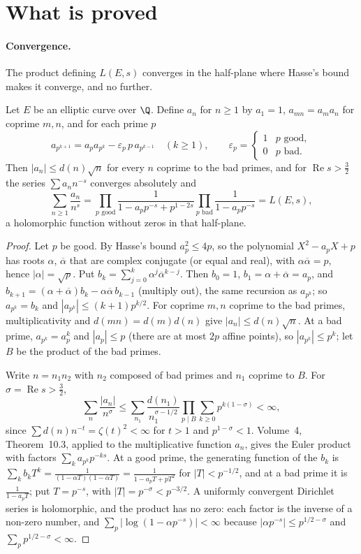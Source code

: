 \section{What is proved}

\paragraph{Convergence.} The product defining $L(E,s)$ converges in the half-plane where Hasse's bound makes it converge, and no further.

\begin{proposition}\label{conjectures:prop:eulerconv}
Let $E$ be an elliptic curve over $\Q$. Define $a_n$ for $n\ge1$ by $a_1=1$, $a_{mn}=a_ma_n$ for coprime $m,n$, and for each prime $p$
\[
a_{p^{k+1}}=a_pa_{p^k}-\varepsilon_p\,p\,a_{p^{k-1}}\quad(k\ge1),\qquad\varepsilon_p=\begin{cases}1&p\text{ good},\\0&p\text{ bad}.\end{cases}
\]
Then $|a_n|\le d(n)\sqrt n$ for every $n$ coprime to the bad primes, and for $\operatorname{Re}s>\frac32$ the series $\sum a_nn^{-s}$ converges absolutely and
\[
\sum_{n\ge1}\frac{a_n}{n^s}=\prod_{p\text{ good}}\frac1{1-a_pp^{-s}+p^{1-2s}}\prod_{p\text{ bad}}\frac1{1-a_pp^{-s}}=L(E,s),
\]
a holomorphic function without zeros in that half-plane.
\end{proposition}
\begin{proof}
Let $p$ be good. By Hasse's bound $a_p^2\le4p$, so the polynomial $X^2-a_pX+p$ has roots $\alpha$, $\overline\alpha$ that are complex conjugate (or equal and
real), with $\alpha\overline\alpha=p$, hence $|\alpha|=\sqrt p$. Put $b_k=\sum_{j=0}^k\alpha^j\overline\alpha^{k-j}$. Then $b_0=1$, $b_1=\alpha+\overline\alpha=a_p$,
and $b_{k+1}=(\alpha+\overline\alpha)b_k-\alpha\overline\alpha\,b_{k-1}$ (multiply out), the same recursion as $a_{p^k}$; so $a_{p^k}=b_k$ and $|a_{p^k}|\le(k+1)p^{k/2}$.
For coprime $m,n$ coprime to the bad primes, multiplicativity and $d(mn)=d(m)d(n)$ give $|a_n|\le d(n)\sqrt n$. At a bad prime, $a_{p^k}=a_p^k$ and
$|a_p|\le p$ (there are at most $2p$ affine points), so $|a_{p^k}|\le p^k$; let $B$ be the product of the bad primes.

Write $n=n_1n_2$ with $n_2$ composed of bad primes and $n_1$ coprime to $B$. For $\sigma=\operatorname{Re}s>\frac32$,
\[
\sum_n\frac{|a_n|}{n^\sigma}\le\sum_{n_1}\frac{d(n_1)}{n_1^{\sigma-1/2}}\prod_{p\mid B}\sum_{k\ge0}p^{k(1-\sigma)}<\infty,
\]
since $\sum d(n)n^{-t}=\zeta(t)^2<\infty$ for $t>1$ and $p^{1-\sigma}<1$. Volume~4, Theorem~10.3, applied to the multiplicative function $a_n$, gives the Euler
product with factors $\sum_ka_{p^k}p^{-ks}$. At a good prime, the generating function of the $b_k$ is
$\sum_kb_kT^k=\frac1{(1-\alpha T)(1-\overline\alpha T)}=\frac1{1-a_pT+pT^2}$ for $|T|<p^{-1/2}$, and at a bad prime it is $\frac1{1-a_pT}$; put $T=p^{-s}$,
with $|T|=p^{-\sigma}<p^{-3/2}$. A uniformly convergent Dirichlet series is holomorphic, and the product has no zero: each factor is the inverse of a
non-zero number, and $\sum_p|\log(1-\alpha p^{-s})|<\infty$ because $|\alpha p^{-s}|\le p^{1/2-\sigma}$ and $\sum_pp^{1/2-\sigma}<\infty$.
\end{proof}

